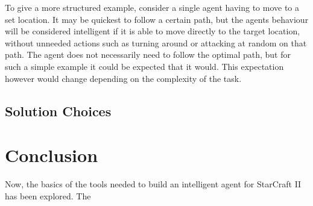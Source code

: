 To give a more structured example, consider a single agent having to move to
a set location. It may be quickest to follow a certain path, but the agents
behaviour will be considered intelligent if it is able to move directly to the
target location, without unneeded actions such as turning around or attacking at
random on that path. The agent does not necessarily need to follow the optimal
path, but for such a simple example it could be expected that it would. This
expectation however would change depending on the complexity of the task.

\subsection{Solution Choices}

\section{Conclusion}

Now, the basics of the tools needed to build an intelligent agent for StarCraft
II has been explored. The 
